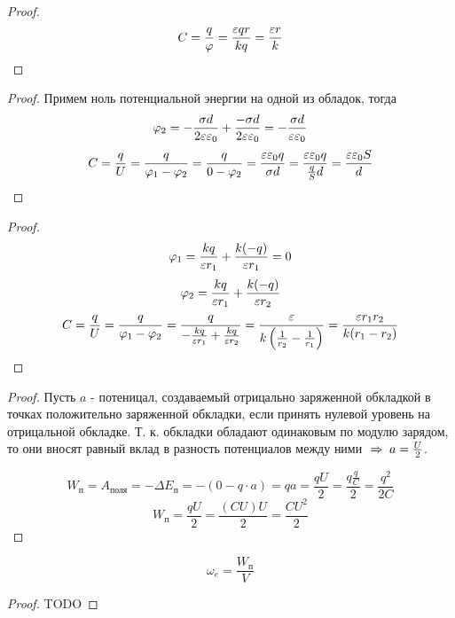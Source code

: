 \begin{proof}
	\[ C = \frac{q}{\varphi} = \frac{\varepsilon qr}{kq} = \frac{\varepsilon r}{k} \]
\end{proof}

\begin{proof}
	Примем ноль потенциальной энергии на одной из обладок, тогда
	\[ \varphi_2 = -\frac{\sigma d}{2 \varepsilon \varepsilon_0} + \frac{-\sigma d}{2 \varepsilon \varepsilon_0} = -\frac{\sigma d}{\varepsilon \varepsilon_0}\]
	\[ C = \frac{q}{U} = \frac{q}{\varphi_1 - \varphi_2} = \frac{q}{0 - \varphi_2} = \frac{\varepsilon \varepsilon_0 q}{\sigma d} = \frac{\varepsilon \varepsilon_0 q}{\frac{q}{S} d} = \frac{\varepsilon \varepsilon_0 S}{d} \]
\end{proof}

\begin{proof}
	\[ \varphi_1 = \frac{k q}{\varepsilon r_1} + \frac{k (-q)}{\varepsilon r_1} = 0 \]
	\[ \varphi_2 = \frac{k q}{\varepsilon r_1} + \frac{k (-q)}{\varepsilon r_2} \]
	\[ C = \frac{q}{U} = \frac{q}{\varphi_1 - \varphi_2} = \frac{q}{-\frac{k q}{\varepsilon r_1} + \frac{k q}{\varepsilon r_2}} = \frac{\varepsilon}{k \left( \frac{1}{r_2} - \frac{1}{r_1} \right)} = \frac{\varepsilon r_1 r_2}{k (r_1 - r_2)} \]
\end{proof}


\begin{proof}
	Пусть $a$ - потеницал, создаваемый отрицально заряженной обкладкой в точках положительно заряженной обкладки, если принять нулевой уровень на отрицальной обкладке. Т. к. обкладки обладают одинаковым по модулю зарядом, то они вносят равный вклад в разность потенциалов между ними $\;\Rightarrow\; a = \frac{U}{2}$.

	\[ W_\text{п} = A_\text{поля} = -\Delta E_\text{п} = -(0 - q \cdot a) = q a = \frac{qU}{2} = \frac{q \frac{q}{C}}{2} = \frac{q^2}{2C} \]
	\[ W_\text{п} = \frac{qU}{2} = \frac{(CU)U}{2} = \frac{CU^2}{2} \]
\end{proof}

\[ \omega_e = \frac{W_\text{п}}{V} \]

\begin{proof}
	TODO
\end{proof}